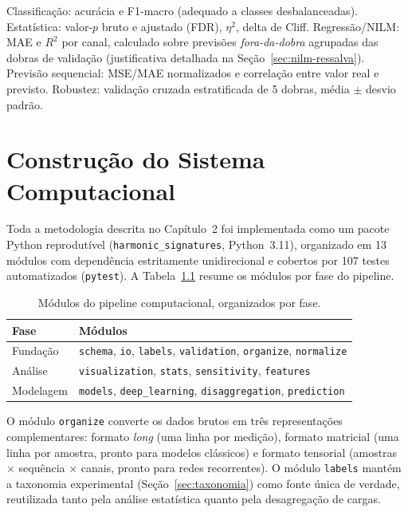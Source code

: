 \documentclass[12pt,a4paper]{report}
\begin{document}
Classificação: acurácia e F1-macro (adequado a classes desbalanceadas).
Estatística: valor-$p$ bruto e ajustado (FDR), $\eta^2$, delta de Cliff.
Regressão/NILM: MAE e $R^2$ por canal, calculado sobre previsões
\emph{fora-da-dobra} agrupadas das dobras de validação (justificativa
detalhada na Seção~\ref{sec:nilm-ressalva}). Previsão sequencial: MSE/MAE
normalizados e correlação entre valor real e previsto. Robustez: validação
cruzada estratificada de 5 dobras, média $\pm$ desvio padrão.

\chapter{Construção do Sistema Computacional}

Toda a metodologia descrita no Capítulo~2 foi implementada como um pacote
Python reprodutível (\texttt{harmonic\_signatures}, Python~3.11), organizado
em 13 módulos com dependência estritamente unidirecional e cobertos por 107
testes automatizados (\texttt{pytest}). A Tabela~\ref{tab:modulos} resume os
módulos por fase do pipeline.

\begin{table}[H]
\centering
\caption{Módulos do pipeline computacional, organizados por fase.}
\label{tab:modulos}
\begin{tabular}{@{}ll@{}}
\toprule
\textbf{Fase} & \textbf{Módulos} \\
\midrule
Fundação & \texttt{schema}, \texttt{io}, \texttt{labels}, \texttt{validation}, \texttt{organize}, \texttt{normalize} \\
Análise & \texttt{visualization}, \texttt{stats}, \texttt{sensitivity}, \texttt{features} \\
Modelagem & \texttt{models}, \texttt{deep\_learning}, \texttt{disaggregation}, \texttt{prediction} \\
\bottomrule
\end{tabular}
\end{table}

O módulo \texttt{organize} converte os dados brutos em três representações
complementares: formato \emph{long} (uma linha por medição), formato
matricial (uma linha por amostra, pronto para modelos clássicos) e formato
tensorial (amostras $\times$ sequência $\times$ canais, pronto para redes
recorrentes). O módulo \texttt{labels} mantém a taxonomia experimental
(Seção~\ref{sec:taxonomia}) como fonte única de verdade, reutilizada tanto
pela análise estatística quanto pela desagregação de cargas.
\end{document}
